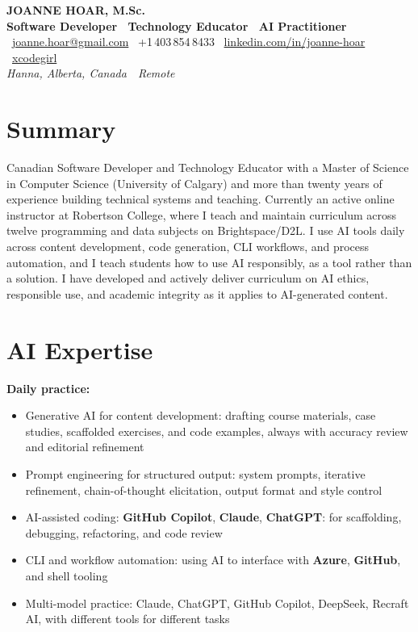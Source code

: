 \documentclass[10pt]{article}
\newcommand{\tech}[1]{\textcolor{secondary}{\textbf{#1}}}
\begin{document}
\begin{center}
    {\Huge \textbf{JOANNE HOAR, M.Sc.}} \\[4pt]
    {\Large \tech{Software Developer \textbullet\ Technology Educator \textbullet\ AI Practitioner}} \\[6pt]
    ~\href{mailto:joanne.hoar@gmail.com}{joanne.hoar@gmail.com}
    \hfill
    ~+1\,403\,854\,8433
    \hfill
    ~\href{https://linkedin.com/in/joanne-hoar/}{linkedin.com/in/joanne-hoar}
    \hfill
    ~\href{https://github.com/xcodegirl}{xcodegirl}
    \\[2pt]
    \textit{Hanna, Alberta, Canada}~\textbullet~\textit{Remote}
\end{center}

\section*{Summary}

Canadian Software Developer and Technology Educator with a Master of Science in Computer Science (University of Calgary) and more than twenty years of experience building technical systems and teaching. Currently an active online instructor at Robertson College, where I teach and maintain curriculum across twelve programming and data subjects on Brightspace/D2L. I use AI tools daily across content development, code generation, CLI workflows, and process automation, and I teach students how to use AI responsibly, as a tool rather than a solution. I have developed and actively deliver curriculum on AI ethics, responsible use, and academic integrity as it applies to AI-generated content.

\section*{AI Expertise}

\textbf{Daily practice:}
\begin{itemize}
    \item Generative AI for content development: drafting course materials, case studies, scaffolded exercises, and code examples, always with accuracy review and editorial refinement
    \item Prompt engineering for structured output: system prompts, iterative refinement, chain-of-thought elicitation, output format and style control
    \item AI-assisted coding: \tech{GitHub Copilot}, \tech{Claude}, \tech{ChatGPT}: for scaffolding, debugging, refactoring, and code review
    \item CLI and workflow automation: using AI to interface with \tech{Azure}, \tech{GitHub}, and shell tooling
    \item Multi-model practice: Claude, ChatGPT, GitHub Copilot, DeepSeek, Recraft AI, with different tools for different tasks
\end{itemize}
\end{document}
